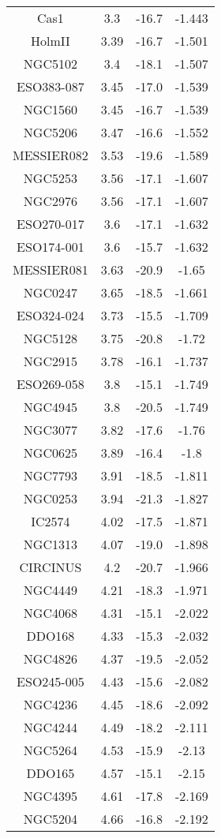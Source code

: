 \begin{longtable}{||c|ccc||}
		Cas1 & 3.3 & -16.7 & -1.443 \\ HolmII & 3.39 & -16.7 & -1.501 \\
		NGC5102 & 3.4 & -18.1 & -1.507 \\ ESO383-087 & 3.45 & -17.0 & -1.539 \\
		NGC1560 & 3.45 & -16.7 & -1.539 \\ NGC5206 & 3.47 & -16.6 & -1.552 \\
		MESSIER082 & 3.53 & -19.6 & -1.589 \\ NGC5253 & 3.56 & -17.1 & -1.607 \\
		NGC2976 & 3.56 & -17.1 & -1.607 \\ ESO270-017 & 3.6 & -17.1 & -1.632 \\
		ESO174-001 & 3.6 & -15.7 & -1.632 \\ MESSIER081 & 3.63 & -20.9 & -1.65 \\
		NGC0247 & 3.65 & -18.5 & -1.661 \\ ESO324-024 & 3.73 & -15.5 & -1.709 \\
		NGC5128 & 3.75 & -20.8 & -1.72 \\ NGC2915 & 3.78 & -16.1 & -1.737 \\
		ESO269-058 & 3.8 & -15.1 & -1.749 \\ NGC4945 & 3.8 & -20.5 & -1.749 \\
		NGC3077 & 3.82 & -17.6 & -1.76 \\ NGC0625 & 3.89 & -16.4 & -1.8 \\
		NGC7793 & 3.91 & -18.5 & -1.811 \\ NGC0253 & 3.94 & -21.3 & -1.827 \\
		IC2574 & 4.02 & -17.5 & -1.871 \\ NGC1313 & 4.07 & -19.0 & -1.898 \\
		CIRCINUS & 4.2 & -20.7 & -1.966 \\ NGC4449 & 4.21 & -18.3 & -1.971 \\
		NGC4068 & 4.31 & -15.1 & -2.022 \\ DDO168 & 4.33 & -15.3 & -2.032 \\
		NGC4826 & 4.37 & -19.5 & -2.052 \\ ESO245-005 & 4.43 & -15.6 & -2.082 \\
		NGC4236 & 4.45 & -18.6 & -2.092 \\ NGC4244 & 4.49 & -18.2 & -2.111 \\
		NGC5264 & 4.53 & -15.9 & -2.13 \\ DDO165 & 4.57 & -15.1 & -2.15 \\
		NGC4395 & 4.61 & -17.8 & -2.169 \\ NGC5204 & 4.66 & -16.8 & -2.192 \\

\end{longtable}
